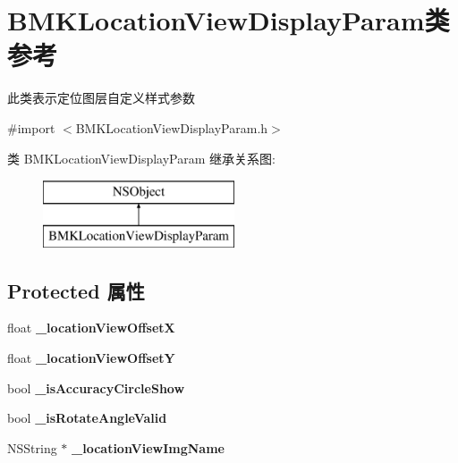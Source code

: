 \hypertarget{interface_b_m_k_location_view_display_param}{\section{B\+M\+K\+Location\+View\+Display\+Param类 参考}
\label{interface_b_m_k_location_view_display_param}
}


此类表示定位图层自定义样式参数  




{\ttfamily \#import $<$B\+M\+K\+Location\+View\+Display\+Param.\+h$>$}

类 B\+M\+K\+Location\+View\+Display\+Param 继承关系图\+:\begin{figure}[H]
\begin{center}
\leavevmode
\includegraphics[height=2.000000cm]{interface_b_m_k_location_view_display_param}
\end{center}
\end{figure}
\subsection*{Protected 属性}
\begin{DoxyCompactItemize}
\item 
\hypertarget{interface_b_m_k_location_view_display_param_aca7d451721e1c1e3f75766fe3a3572e1}{float {\bfseries \+\_\+location\+View\+Offset\+X}}\label{interface_b_m_k_location_view_display_param_aca7d451721e1c1e3f75766fe3a3572e1}

\item 
\hypertarget{interface_b_m_k_location_view_display_param_a7914b096cec7ba724e9eb0b752c77dc0}{float {\bfseries \+\_\+location\+View\+Offset\+Y}}\label{interface_b_m_k_location_view_display_param_a7914b096cec7ba724e9eb0b752c77dc0}

\item 
\hypertarget{interface_b_m_k_location_view_display_param_a376ad9f3e561b1ff5c1fed963ffa62b8}{bool {\bfseries \+\_\+is\+Accuracy\+Circle\+Show}}\label{interface_b_m_k_location_view_display_param_a376ad9f3e561b1ff5c1fed963ffa62b8}

\item 
\hypertarget{interface_b_m_k_location_view_display_param_a9a113a1e0217f64e06311e752263d6e0}{bool {\bfseries \+\_\+is\+Rotate\+Angle\+Valid}}\label{interface_b_m_k_location_view_display_param_a9a113a1e0217f64e06311e752263d6e0}

\item 
\hypertarget{interface_b_m_k_location_view_display_param_a8cc611777402a8a9ca0fe3b12a48d87b}{N\+S\+String $\ast$ {\bfseries \+\_\+location\+View\+Img\+Name}}\label{interface_b_m_k_location_view_display_param_a8cc611777402a8a9ca0fe3b12a48d87b}

\end{DoxyCompactItemize}
